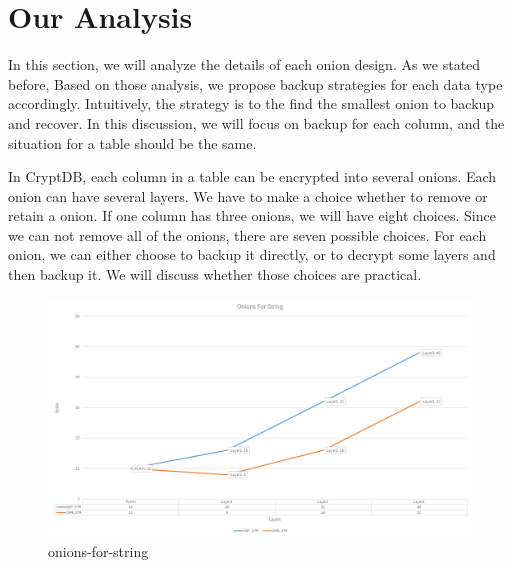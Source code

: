 \section{Our Analysis}


In this section, we will analyze the details of each onion design. As we stated before, Based on those analysis, we propose backup strategies for each data type accordingly. Intuitively, the strategy is to the find the smallest onion to backup and recover. In this discussion, we will focus on backup for each column, and the situation for a table should be the same. 

In CryptDB, each column in a table can be encrypted into several onions. Each onion can have several layers. We have to make a choice whether to remove or retain a onion. If one column has three onions, we will have eight choices. Since we can not remove all of the onions, there are seven possible choices. For each onion, we can either choose to backup it directly, or to decrypt some layers and then backup it. We will discuss whether those choices are practical.

\begin{figure}[tb]
\centering
\includegraphics[width=\columnwidth]{images/onions-for-string.png}
\caption{onions-for-string}
\label{fig:stack4}
\end{figure}


